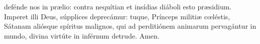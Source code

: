 defénde nos in pr{\ae}lio: contra nequítian et insídias diáboli esto pr{\ae}sidium. Imperet illi Deus, 
súpplices deprecámur: tuque, Prínceps militi{\ae} c{\oe}léstis, Sátanam aliósque spíritus malignos, qui ad perditiónem animarum pervagántur in mundo,
divina virtúte in inférnum detrude. Amen.